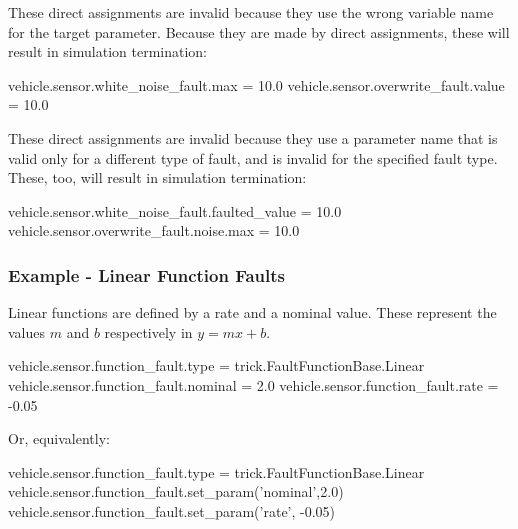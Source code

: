\documentclass[11pt,fleqn]{report}
\begin{document}
These direct assignments are invalid because they use the wrong variable
name for the target parameter. Because they are made by direct assignments,
these will result in simulation termination:
\begin{codePython}
 vehicle.sensor.white_noise_fault.max = 10.0
 vehicle.sensor.overwrite_fault.value = 10.0
\end{codePython}
These direct assignments are invalid because they use a parameter name that
is valid only for a different type of fault, and is invalid for the
specified fault type. These, too, will result in simulation termination:
\begin{codePython}
 vehicle.sensor.white_noise_fault.faulted_value = 10.0
 vehicle.sensor.overwrite_fault.noise.max       = 10.0
\end{codePython}



\subsubsection{Example - Linear Function Faults}
Linear functions are defined by a rate and a nominal value.
These represent the values $m$ and $b$ respectively in $y=mx+b$.
\begin{codePython}
vehicle.sensor.function_fault.type = trick.FaultFunctionBase.Linear
vehicle.sensor.function_fault.nominal = 2.0
vehicle.sensor.function_fault.rate = -0.05
\end{codePython}
Or, equivalently:
\begin{codePython}
vehicle.sensor.function_fault.type = trick.FaultFunctionBase.Linear
vehicle.sensor.function_fault.set_param('nominal',2.0)
vehicle.sensor.function_fault.set_param('rate', -0.05)
\end{codePython}
\end{document}
